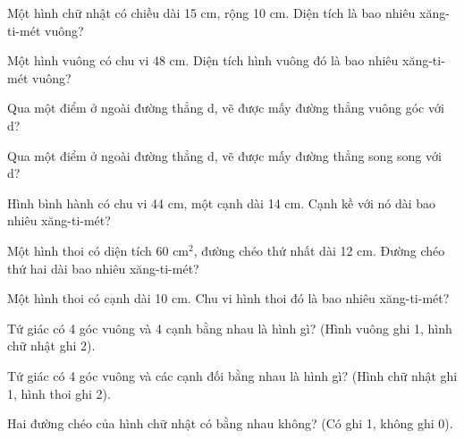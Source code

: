 \begin{ex}
Một hình chữ nhật có chiều dài 15 cm, rộng 10 cm. Diện tích là bao nhiêu xăng-ti-mét vuông?
\end{ex}

\begin{ex}
Một hình vuông có chu vi 48 cm. Diện tích hình vuông đó là bao nhiêu xăng-ti-mét vuông?
\end{ex}

\begin{ex}
Qua một điểm ở ngoài đường thẳng d, vẽ được mấy đường thẳng vuông góc với d?
\end{ex}

\begin{ex}
Qua một điểm ở ngoài đường thẳng d, vẽ được mấy đường thẳng song song với d?
\end{ex}

\begin{ex}
Hình bình hành có chu vi 44 cm, một cạnh dài 14 cm. Cạnh kề với nó dài bao nhiêu xăng-ti-mét?
\end{ex}

\begin{ex}
Một hình thoi có diện tích $60\text{ cm}^2$, đường chéo thứ nhất dài 12 cm. Đường chéo thứ hai dài bao nhiêu xăng-ti-mét?
\end{ex}

\begin{ex}
Một hình thoi có cạnh dài 10 cm. Chu vi hình thoi đó là bao nhiêu xăng-ti-mét?
\end{ex}

\begin{ex}
Tứ giác có 4 góc vuông và 4 cạnh bằng nhau là hình gì? (Hình vuông ghi 1, hình chữ nhật ghi 2).
\end{ex}

\begin{ex}
Tứ giác có 4 góc vuông và các cạnh đối bằng nhau là hình gì? (Hình chữ nhật ghi 1, hình thoi ghi 2).
\end{ex}

\begin{ex}
Hai đường chéo của hình chữ nhật có bằng nhau không? (Có ghi 1, không ghi 0).
\end{ex}

